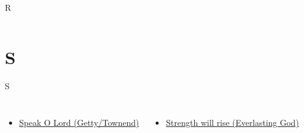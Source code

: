 \documentclass{beamer}
\begin{document}
\begin{frame}{R}
\begin{columns}

    


    


\end{columns}

\end{frame}

\section{S}

\begin{frame}{S}
\begin{columns}
    \begin{itemize}
    \item \hyperlink{Speak O Lord[](Getty/Townend)1}{Speak O Lord (Getty/Townend)}
\end{itemize}
    \begin{itemize}
    \item \hyperlink{Everlasting God['Strength will rise']V}{Strength will rise (Everlasting God)}
\end{itemize}


\end{columns}

\end{frame}
\end{document}
